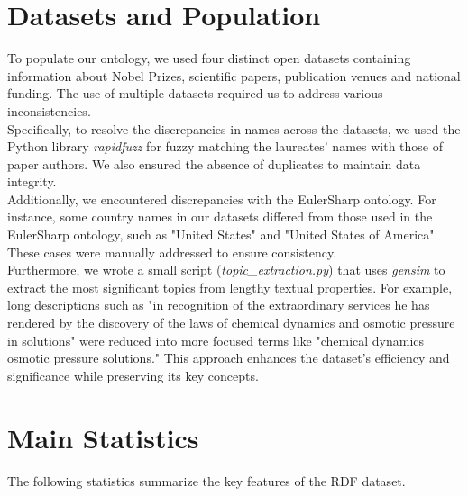 \documentclass{article}
\begin{document}
\section*{Datasets and Population}
To populate our ontology, we used four distinct open datasets containing information about Nobel Prizes, scientific papers, publication venues and
national funding. The use of multiple datasets required us to address various inconsistencies. \\
Specifically, to resolve the discrepancies in names across the datasets,
we used the Python library \textit{rapidfuzz} for fuzzy matching the laureates' names with those of paper authors. We also ensured the absence of duplicates to
maintain data integrity. \\
Additionally, we encountered discrepancies with the EulerSharp ontology.
For instance, some country names in our datasets differed from those used in the EulerSharp ontology, such as "United
States" and "United States of America". These cases were manually addressed to ensure consistency. \\
Furthermore, we wrote a small script (\textit{topic\_extraction.py}) that uses \textit{gensim} to extract the most significant topics from lengthy textual properties.
For example, long descriptions such as "in recognition of the extraordinary services he has rendered by the
discovery of the laws of chemical dynamics and osmotic pressure in solutions" were reduced into more focused terms like "chemical dynamics osmotic
pressure solutions." This approach enhances the dataset's efficiency and significance while preserving its key concepts.

\section*{Main Statistics}

The following statistics summarize the key features of the RDF dataset.
\end{document}

